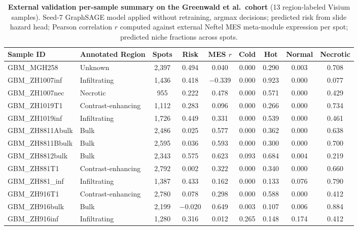 \documentclass[11pt,letterpaper]{article}
\begin{document}
\begin{table}[H]
\centering
\caption{\textbf{External validation per-sample summary on the Greenwald et al.\ cohort} (13 region-labeled Visium samples). Seed-7 GraphSAGE model applied without retraining, argmax decisions; predicted risk from slide hazard head; Pearson correlation $r$ computed against external Neftel MES meta-module expression per spot; predicted niche fractions across spots.}
\label{tab:s2}
\footnotesize
\setlength{\tabcolsep}{4pt}
\begin{tabular}{llccccccc}
\toprule
\textbf{Sample ID} & \textbf{Annotated Region} & \textbf{Spots} & \textbf{Risk} & \textbf{MES $r$} & \textbf{Cold} & \textbf{Hot} & \textbf{Normal} & \textbf{Necrotic} \\
\midrule
GBM\_MGH258      & Unknown            & 2{,}397 & 0.494  & 0.040  & 0.000 & 0.290 & 0.003 & 0.708 \\
GBM\_ZH1007inf   & Infiltrating       & 1{,}436 & 0.418  & $-$0.339 & 0.000 & 0.923 & 0.000 & 0.077 \\
GBM\_ZH1007nec   & Necrotic           & 955   & 0.222  & 0.478  & 0.000 & 0.571 & 0.000 & 0.429 \\
GBM\_ZH1019T1    & Contrast-enhancing & 1{,}112 & 0.283  & 0.096  & 0.000 & 0.266 & 0.000 & 0.734 \\
GBM\_ZH1019inf   & Infiltrating       & 1{,}726 & 0.449  & 0.331  & 0.000 & 0.539 & 0.000 & 0.461 \\
GBM\_ZH8811Abulk & Bulk               & 2{,}486 & 0.025  & 0.577  & 0.000 & 0.362 & 0.000 & 0.638 \\
GBM\_ZH8811Bbulk & Bulk               & 2{,}595 & 0.036  & 0.593  & 0.000 & 0.300 & 0.000 & 0.700 \\
GBM\_ZH8812bulk  & Bulk               & 2{,}343 & 0.575  & 0.623  & 0.093 & 0.684 & 0.004 & 0.219 \\
GBM\_ZH881T1     & Contrast-enhancing & 2{,}792 & 0.002  & 0.322  & 0.000 & 0.340 & 0.000 & 0.660 \\
GBM\_ZH881\_inf  & Infiltrating       & 1{,}387 & 0.433  & 0.162  & 0.000 & 0.133 & 0.076 & 0.790 \\
GBM\_ZH916T1     & Contrast-enhancing & 2{,}780 & 0.078  & 0.298  & 0.000 & 0.588 & 0.000 & 0.412 \\
GBM\_ZH916bulk   & Bulk               & 2{,}199 & $-$0.020 & 0.649 & 0.003 & 0.107 & 0.006 & 0.884 \\
GBM\_ZH916inf    & Infiltrating       & 1{,}280 & 0.316  & 0.012  & 0.265 & 0.148 & 0.174 & 0.412 \\
\bottomrule
\end{tabular}
\end{table}
\end{document}
